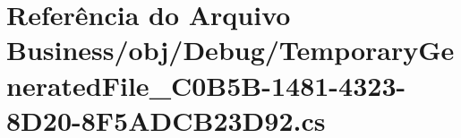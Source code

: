 \hypertarget{Business_2obj_2Debug_2TemporaryGeneratedFile__036C0B5B-1481-4323-8D20-8F5ADCB23D92_8cs}{}\section{Referência do Arquivo Business/obj/\+Debug/\+Temporary\+Generated\+File\+\_\+C0\+B5\+B-\/1481-\/4323-\/8\+D20-\/8\+F5\+A\+D\+C\+B23\+D92.cs}
\label{Business_2obj_2Debug_2TemporaryGeneratedFile__036C0B5B-1481-4323-8D20-8F5ADCB23D92_8cs}
